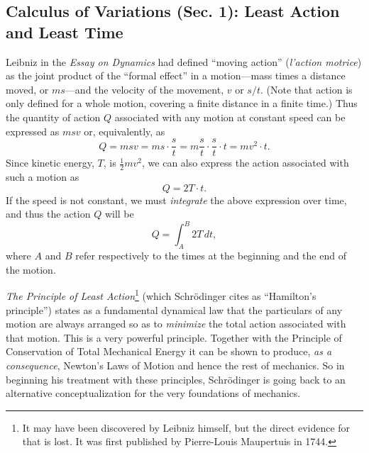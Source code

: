 \subsection*{Calculus of Variations (Sec. 1): Least Action and Least Time}

Leibniz in the \emph{Essay on Dynamics} had defined ``moving action''
(\emph{l'action motrice}) as the joint product of the ``formal effect''
in a motion---mass times a distance moved, or $ms$---and the
velocity of the movement, $v$ or $s/t$. (Note that
  action is only defined for a whole motion, covering a finite distance
  in a finite time.) Thus the quantity of action $Q$ associated
with any motion at constant speed can be expressed as $msv$ or,
equivalently, as
\begin{equation*}
Q = msv = ms\cdot\frac{s}{t}=m\frac{s}{t}\cdot\frac{s}{t}\cdot t = mv^2\cdot t.
\end{equation*}
Since kinetic energy, $T$, is $\frac{1}{2}mv^2$, we
can also express the action associated with such a motion as
\begin{equation*}
Q = 2T\cdot t.
\end{equation*}
If the speed is not constant, we must \emph{integrate} the above
expression over time, and thus the action $Q$ will be
\begin{equation*}
Q = \int_{A}^{B} 2T\,dt,
\end{equation*}
where $A$ and $B$ refer respectively to the times at the beginning and the
end of the motion.

\emph{The Principle of Least Action}\footnote{It may have been
  discovered by Leibniz himself, but the direct evidence for that is
  lost. It was first published by Pierre-Louis Maupertuis in 1744.}
(which Schrödinger cites as ``Hamilton's principle'') states as a 
fundamental dynamical law that the particulars of any motion
are always arranged so as to \emph{minimize} the total action associated
with that motion. This is a very powerful principle. Together with the
Principle of Conservation of Total Mechanical Energy it can be shown to
produce, \emph{as a consequence}, Newton's Laws of Motion and hence the
rest of mechanics. So in beginning his treatment with these
principles, Schrödinger is going back to an alternative
conceptualization for the very foundations of mechanics.

